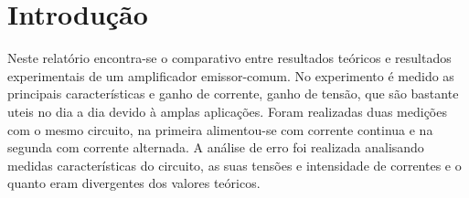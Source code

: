 \chapter*[Introdu\c{c}\~{a}o]{Introdu\c{c}\~{a}o}

	Neste relatório encontra-se o comparativo entre resultados teóricos e resultados experimentais de um amplificador emissor-comum.
	No experimento é medido as principais características e ganho de corrente, ganho de tensão, que são bastante uteis no dia a dia devido à amplas aplicações. 
	Foram realizadas duas medições com o mesmo circuito, na primeira alimentou-se com corrente continua e na segunda com corrente alternada. 
	A análise de erro foi realizada analisando medidas características do circuito, as suas tensões e intensidade de correntes e o quanto eram divergentes dos valores teóricos. 